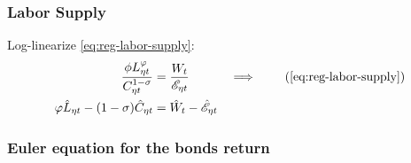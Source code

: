 \documentclass[../thesis.tex]{subfiles}
\begin{document}
\begin{comment}
	
Isolate $\hat{\mathscr{E}}_{\eta t}$ in \ref{eq:reg-ll-regional-consumption-and-prices} and substitute in \ref{eq:reg-ll-total-expense-level}:
\begin{align}
	\hat{C}_{\eta 1 t} &= \hat{\mathscr{E}}_{\eta t} - \hat{P}_{\eta t} \iff \hat{\mathscr{E}}_{\eta t} = \hat{C}_{\eta 1 t} + \hat{P}_{\eta t} \tag{\ref{eq:reg-ll-regional-consumption-and-prices}} \\
	\hat{C}_{\eta 1 t} + \hat{P}_{\eta t} &= \hat{C}_{\eta t} + \omega_{\eta 1} \hat{P}_{\eta t} + (1 -\omega_{\eta 1}) \hat{P}_{\nu t} \implies \nonumber \\
	\hat{C}_{\eta t} - \hat{C}_{\eta 1 t} &= (1 -\omega_{\eta 1}) (\hat{P}_{\eta t} - \hat{P}_{\nu t}) \label{eq:reg-ll-total-expense-level-2}
\end{align}

Equation \ref{eq:reg-ll-total-expense-level-2} shows that the distance between the regional consumption and the good $\eta$ consumption is proportional to the distance between the variations of both regional price levels.	
	
\end{comment}




\subsubsection*{Labor Supply}

Log-linearize \ref{eq:reg-labor-supply}:
\begin{alignat}{2}
	\frac{\phi L_{\eta t}^{\varphi}}{C_{\eta t}^{1-\sigma}} &= \frac{W_t}{\te} &\implies \tag{\ref{eq:reg-labor-supply}} \\
	\varphi \hat{L}_{\eta t} - (1 -\sigma) \hat{C}_{\eta t} &= \hat{W}_t - \hat{ \mathscr{E} }_{\eta t} & \label{eq:reg-ll-labor-supply}
\end{alignat}


\subsubsection*{Euler equation for the bonds return}
\end{document}
